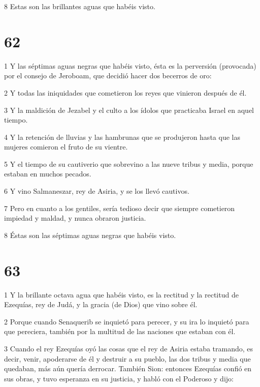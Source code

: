 \par 8 Estas son las brillantes aguas que habéis visto.

\chapter{62}

\par 1 Y las séptimas aguas negras que habéis visto, ésta es la perversión (provocada) por el consejo de Jeroboam, que decidió hacer dos becerros de oro:

\par 2 Y todas las iniquidades que cometieron los reyes que vinieron después de él.

\par 3 Y la maldición de Jezabel y el culto a los ídolos que practicaba Israel en aquel tiempo.

\par 4 Y la retención de lluvias y las hambrunas que se produjeron hasta que las mujeres comieron el fruto de su vientre.

\par 5 Y el tiempo de su cautiverio que sobrevino a las nueve tribus y media, porque estaban en muchos pecados.

\par 6 Y vino Salmaneszar, rey de Asiria, y se los llevó cautivos.

\par 7 Pero en cuanto a los gentiles, sería tedioso decir que siempre cometieron impiedad y maldad, y nunca obraron justicia.

\par 8 Éstas son las séptimas aguas negras que habéis visto.

\chapter{63}

\par 1 Y la brillante octava agua que habéis visto, es la rectitud y la rectitud de Ezequías, rey de Judá, y la gracia (de Dios) que vino sobre él.

\par 2 Porque cuando Senaquerib se inquietó para perecer, y su ira lo inquietó para que pereciera, también por la multitud de las naciones que estaban con él.

\par 3 Cuando el rey Ezequías oyó las cosas que el rey de Asiria estaba tramando, es decir, venir, apoderarse de él y destruir a su pueblo, las dos tribus y media que quedaban, más aún quería derrocar. También Sion: entonces Ezequías confió en sus obras, y tuvo esperanza en su justicia, y habló con el Poderoso y dijo:

